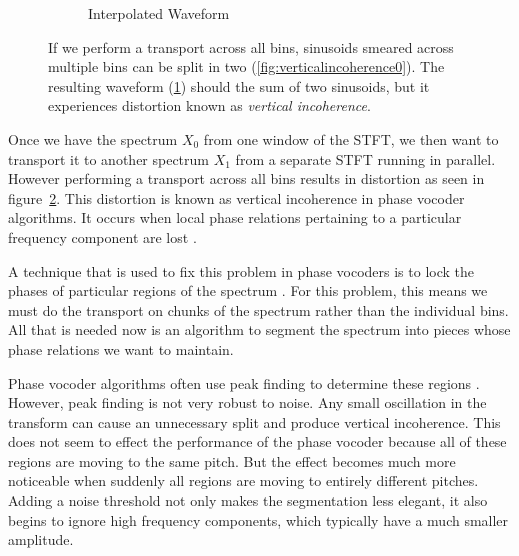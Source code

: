\documentclass[12pt]{article}
\begin{document}
\begin{figure}[!h]
\begin{center}
\begin{subfigure}[b]{0.65\textwidth}
    \caption{Interpolated Waveform}
    \label{fig:verticalincoherence1}
  \end{subfigure}
  \end{center}
  \caption{%
    If we perform a transport across all bins,
    sinusoids smeared across multiple bins can be split in two (\ref{fig:verticalincoherence0}).
    The resulting waveform 
    (\ref{fig:verticalincoherence1}) should the sum of two sinusoids, but it
    experiences distortion
    known as \emph{vertical incoherence}.
  }
  \label{fig:verticalincoherence}
\end{figure}

Once we have the spectrum $X_0$ from one window of the STFT, we then want to transport it to another spectrum $X_1$ from a separate STFT running in parallel.
However performing a transport across all bins results in distortion as seen in figure~\ref{fig:verticalincoherence}.
This distortion is known as vertical incoherence in phase vocoder algorithms. It occurs when local phase relations pertaining to a particular frequency component are lost
\cite{vocoder}.

A technique that is used to fix this problem in phase vocoders is to lock the phases of particular regions of the spectrum
\cite{vocoder}.
For this problem, this means we must do the transport on chunks of the spectrum rather than the individual bins.
All that is needed now is an algorithm to segment the spectrum into pieces whose phase relations we want to maintain.

Phase vocoder algorithms often use peak finding to determine these regions
\cite{vocoder}.
However, peak finding is not very robust to noise. 
Any small oscillation in the transform 
can cause an unnecessary split and produce vertical incoherence.
This does not seem to effect the performance of the phase vocoder because all of these regions are moving to the same pitch.
But the effect becomes much more noticeable when suddenly all regions are moving to entirely different pitches.
Adding a noise threshold not only makes the segmentation less elegant, it also begins to ignore high frequency components, which typically have a much smaller amplitude.
\end{document}
